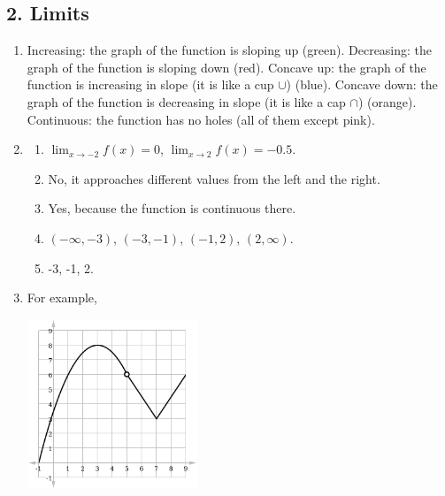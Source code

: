 \subsection*{2. Limits}
\begin{enumerate}
  \item Increasing: the graph of the function is sloping up (green). Decreasing: the graph of the function is sloping down (red). Concave up: the graph
        of the function is increasing in slope (it is like a cup $ \cup $) (blue). Concave down: the graph of the function is decreasing in slope
        (it is like a cap $ \cap $) (orange). Continuous: the function has no holes (all of them except pink).
        \begin{center}
        \end{center}
  \item
    \begin{enumerate}
      \item $ \lim_{x \to -2} f(x) = 0 $, $ \lim_{x \to 2} f(x) = -0.5 $.
      \item No, it approaches different values from the left and the right.
      \item Yes, because the function is continuous there.
      \item $ (-\infty, -3) $, $ (-3, -1) $, $ (-1, 2) $, $ (2, \infty) $.
      \item -3, -1, 2.
    \end{enumerate}
  \item For example,

    \begin{center}
      \includegraphics[width=0.4\textwidth]{function}
    \end{center}
\end{enumerate}

